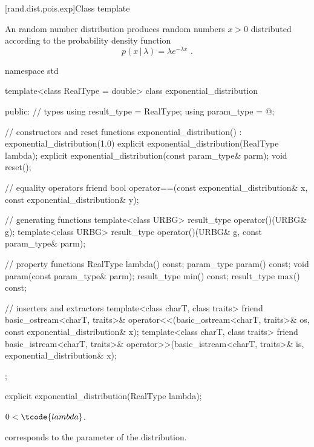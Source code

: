 
[rand.dist.pois.exp]{Class template }%
%

\pnum
An  random number distribution
produces random numbers $x > 0$
distributed according to
the probability density function%
\[ p(x\,|\,\lambda) = \lambda e^{-\lambda x} \text{ .} \]

%
%
\begin{codeblock}
namespace std {
  template<class RealType = double>
  class exponential_distribution {
  public:
    // types
    using result_type = RealType;
    using param_type  = @\unspec@;

    // constructors and reset functions
    exponential_distribution() : exponential_distribution(1.0) {}
    explicit exponential_distribution(RealType lambda);
    explicit exponential_distribution(const param_type& parm);
    void reset();

    // equality operators
    friend bool operator==(const exponential_distribution& x, const exponential_distribution& y);

    // generating functions
    template<class URBG>
      result_type operator()(URBG& g);
    template<class URBG>
      result_type operator()(URBG& g, const param_type& parm);

    // property functions
    RealType lambda() const;
    param_type param() const;
    void param(const param_type& parm);
    result_type min() const;
    result_type max() const;

    // inserters and extractors
    template<class charT, class traits>
      friend basic_ostream<charT, traits>&
        operator<<(basic_ostream<charT, traits>& os, const exponential_distribution& x);
    template<class charT, class traits>
      friend basic_istream<charT, traits>&
        operator>>(basic_istream<charT, traits>& is, exponential_distribution& x);
  };
}
\end{codeblock}


%
\begin{itemdecl}
explicit exponential_distribution(RealType lambda);
\end{itemdecl}

\begin{itemdescr}
\pnum
\expects
$0 < \tcode{lambda}$.

\pnum
\remarks
{} corresponds to the parameter of the distribution.
\end{itemdescr}

